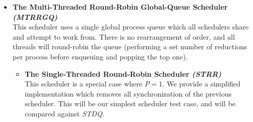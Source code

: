 \begin{itemize}
    \item {\bf The Multi-Threaded Round-Robin Global-Queue Scheduler {\sl (MTRRGQ)}} \\
        This scheduler uses a single global process queue which all schedulers 
        share and attempt to work from. There is no rearrangement of order, and
        all threads will round-robin the queue (performing a set number of
        reductions per process before enqueuing and popping the top one).
        \begin{itemize}
            \item {\bf The Single-Threaded Round-Robin Scheduler {\sl (STRR)}} \\
                This scheduler is a special case where $P=1$. We provide a 
                simplified implementation which removes all synchronization 
                of the previous scheduler. This will be our simplest scheduler 
                test case, and will be compared against {\sl STDQ}.
        \end{itemize}  
 

\end{itemize}
